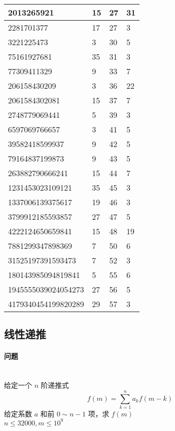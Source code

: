 \begin{center}
\begin{tabular}{|l|l|l|l|}
			\hline
			 2013265921          & 15   & 27   & 31   \\
			\hline
			 2281701377          & 17   & 27   & 3    \\
			\hline
			 3221225473          & 3    & 30   & 5    \\
			\hline
			 75161927681         & 35   & 31   & 3    \\
			\hline
			 77309411329         & 9    & 33   & 7    \\
			\hline
			 206158430209        & 3    & 36   & 22   \\
			\hline
			 2061584302081       & 15   & 37   & 7    \\
			\hline
			 2748779069441       & 5    & 39   & 3    \\
			\hline
			 6597069766657       & 3    & 41   & 5    \\
			\hline
			 39582418599937      & 9    & 42   & 5    \\
			\hline
			 79164837199873      & 9    & 43   & 5    \\
			\hline
			 263882790666241     & 15   & 44   & 7    \\
			\hline
			 1231453023109121    & 35   & 45   & 3    \\
			\hline
			 1337006139375617    & 19   & 46   & 3    \\
			\hline
			 3799912185593857    & 27   & 47   & 5    \\
			\hline
			 4222124650659841    & 15   & 48   & 19   \\
			\hline
			 7881299347898369    & 7    & 50   & 6    \\
			\hline
			 31525197391593473   & 7    & 52   & 3    \\
			\hline
			 180143985094819841  & 5    & 55   & 6    \\
			\hline
			 1945555039024054273 & 27   & 56   & 5    \\
			\hline
			 4179340454199820289 & 29   & 57   & 3    \\
			 \hline
		\end{tabular}
	\end{center}
	\newpage
	\subsection{线性递推}
	\paragraph{问题}~\\
	给定一个 $n$ 阶递推式
	$$
	f(m)=\sum_{k=1}^n a_kf(m-k)
	$$
	给定系数 $a$ 和前 $0\sim n-1$ 项，求 $f(m)$\\
	$n\le32000,m\le10^9$
